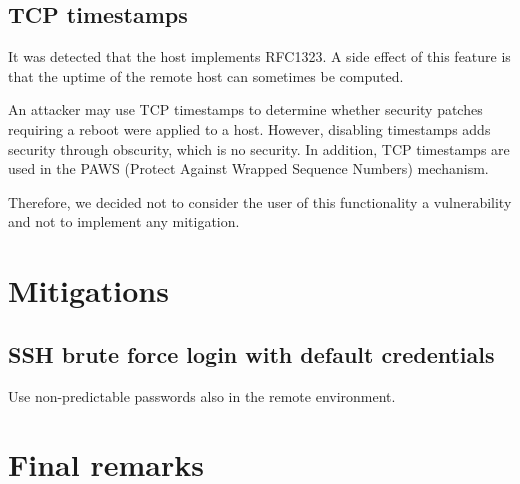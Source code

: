 \documentclass[draft]{homework}
\begin{document}
    \subsection{TCP timestamps}
    \begin{displayquote}
        It was detected that the host implements RFC1323.
        \textelp{}
        A side effect of this feature is that the uptime of the remote host can sometimes be computed.
    \end{displayquote}
    
    An attacker may use TCP timestamps to determine whether security patches requiring a reboot were applied to a host.
    However, disabling timestamps adds security through obscurity, which is no security. 
    In addition, TCP timestamps are used in the PAWS (Protect Against Wrapped Sequence Numbers) mechanism.
    
    Therefore, we decided not to consider the user of this functionality a vulnerability and not to implement any mitigation.
    
    
    
    \section{Mitigations}
    \subsection{SSH brute force login with default credentials}
    Use non-predictable passwords also in the remote environment.
    
    
    
    \section{Final remarks}
\end{document}
